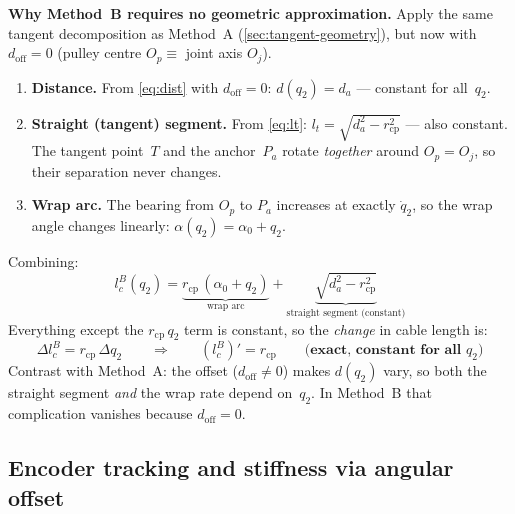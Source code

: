 \documentclass[11pt, a4paper]{article}
\begin{document}
\begin{mdframed}
\textbf{Why Method~B requires no geometric approximation.}\;
Apply the same tangent decomposition as Method~A
(\cref{sec:tangent-geometry}), but now with $d_{\text{off}} = 0$ (pulley
centre $O_p \equiv$ joint axis $O_j$).

\begin{enumerate}
\item \textbf{Distance.}\;
      From \eqref{eq:dist} with $d_{\text{off}} = 0$:
      $d(q_2) = d_a$ --- constant for all~$q_2$.

\item \textbf{Straight (tangent) segment.}\;
      From \eqref{eq:lt}:
      $l_t = \sqrt{d_a^2 - r_{\text{cp}}^2}$ --- also constant.
      The tangent point~$T$ and the anchor~$P_a$ rotate
      \emph{together} around $O_p = O_j$, so their separation
      never changes.

\item \textbf{Wrap arc.}\;
      The bearing from $O_p$ to $P_a$ increases at exactly
      $\dot{q}_2$, so the wrap angle changes linearly:
      $\alpha(q_2) = \alpha_0 + q_2$.
\end{enumerate}

\noindent
Combining:
%
\begin{equation}\label{eq:exact-B}
    l_c^B(q_2)
    = \underbrace{r_{\text{cp}}\,(\alpha_0 + q_2)}_{\text{wrap arc}}
    + \underbrace{\sqrt{d_a^2 - r_{\text{cp}}^2}}_{\text{straight segment (constant)}}
\end{equation}
%
Everything except the $r_{\text{cp}}\,q_2$ term is constant, so the
\emph{change} in cable length is:
%
\begin{equation}\label{eq:delta-lB}
    \Delta l_c^B = r_{\text{cp}}\,\Delta q_2
    \qquad\Longrightarrow\qquad
    (l_c^B)'= r_{\text{cp}}
    \qquad\textbf{(exact, constant for all }q_2\textbf{)}
\end{equation}
%
Contrast with Method~A: the offset ($d_{\text{off}} \neq 0$) makes
$d(q_2)$ vary, so both the straight segment \emph{and} the wrap rate
depend on~$q_2$.  In Method~B that complication vanishes because
$d_{\text{off}} = 0$.
\end{mdframed}

\subsection{Encoder tracking and stiffness via angular offset}
\end{document}
